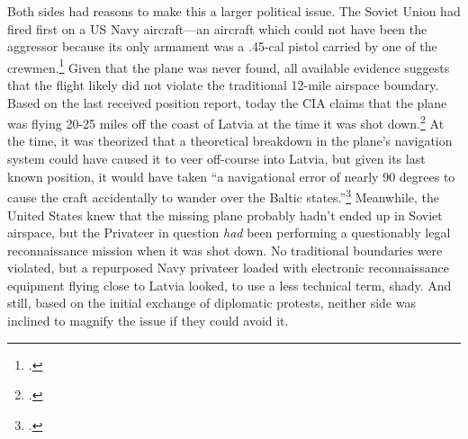 \documentclass[14pt]{extarticle}
\begin{document}
Both sides had reasons to make this a larger political issue. The Soviet Union had fired first on a US Navy aircraft---an aircraft which could not have been the aggressor because its only armament was a .45-cal pistol carried by one of the crewmen.\footcite[p.~7]{peterson_maybe_1993} Given that the plane was never found, all available evidence suggests that the flight likely did not violate the traditional 12-mile airspace boundary. Based on the last received position report, today the CIA claims that the plane was flying 20-25 miles off the coast of Latvia at the time it was shot down.\footcite[p.~7]{peterson_maybe_1993} At the time, it was theorized that a theoretical breakdown in the plane's navigation system could have caused it to veer off-course into Latvia, but given its last known position, it would have taken \enquote{a navigational error of nearly 90 degrees to cause the craft accidentally to wander over the Baltic states.}\footcite{the_new_york_times_soviet_1950} Meanwhile, the United States knew that the missing plane probably hadn't ended up in Soviet airspace, but the Privateer in question \emph{had} been performing a questionably legal reconnaissance mission when it was shot down. No traditional boundaries were violated, but a repurposed Navy privateer loaded with electronic reconnaissance equipment flying close to Latvia looked, to use a less technical term, shady. And still, based on the initial exchange of diplomatic protests, neither side was inclined to magnify the issue if they could avoid it.

\end{document}
